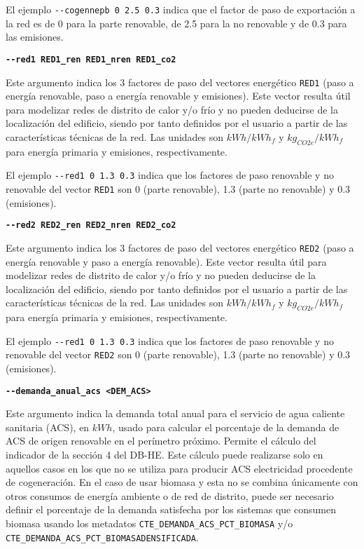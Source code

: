 \documentclass[10pt,notitlepage,oneside,a4paper]{article}
\begin{document}
El ejemplo \texttt{-{}-cogennepb 0 2.5 0.3} indica que el factor de paso de exportación a la red es de 0 para la parte renovable, de 2.5 para la no renovable y de 0.3 para las emisiones.

\textbf{\texttt{-{}-red1 RED1\_ren RED1\_nren RED1\_co2}}

Este argumento indica los 3 factores de paso del vectores energético \texttt{RED1} (paso a energía renovable, paso a energía renovable y emisiones). Este vector resulta útil para modelizar redes de distrito de calor y/o frío y no pueden deducirse de la localización del edificio, siendo por tanto definidos por el usuario a partir de las características técnicas de la red. Las unidades son $kWh/kWh_f$ y $kg_{CO2e}/kWh_f$ para energía primaria y emisiones, respectivamente.

El ejemplo \texttt{-{}-red1 0 1.3 0.3} indica que los factores de paso renovable y no renovable del vector \texttt{RED1} son 0 (parte renovable), 1.3 (parte no renovable) y 0.3 (emisiones).

\textbf{\texttt{-{}-red2 RED2\_ren RED2\_nren RED2\_co2}}

Este argumento indica los 3 factores de paso del vectores energético \texttt{RED2} (paso a energía renovable y paso a energía renovable). Este vector resulta útil para modelizar redes de distrito de calor y/o frío y no pueden deducirse de la localización del edificio, siendo por tanto definidos por el usuario a partir de las características técnicas de la red. Las unidades son $kWh/kWh_f$ y $kg_{CO2e}/kWh_f$ para energía primaria y emisiones, respectivamente.

El ejemplo \texttt{-{}-red1 0 1.3 0.3} indica que los factores de paso renovable y no renovable del vector \texttt{RED2} son 0 (parte renovable), 1.3 (parte no renovable) y 0.3 (emisiones).

\textbf{\texttt{-{}-demanda\_anual\_acs <DEM\_ACS>}}

Este argumento indica la demanda total anual para el servicio de agua caliente sanitaria (ACS), en  $kWh$, usado para calcular el porcentaje de la demanda de ACS de origen renovable en el perímetro próximo. Permite el cálculo del indicador de la sección 4 del DB-HE. Este cálculo puede realizarse solo en aquellos casos en los que no se utiliza para producir ACS electricidad procedente de cogeneración. En el caso de usar biomasa y esta no se combina únicamente con otros consumos de energía ambiente o de red de distrito, puede ser necesario definir el porcentaje de la demanda satisfecha por los sistemas que consumen biomasa usando los metadatos \texttt{CTE\_DEMANDA\_ACS\_PCT\_BIOMASA} y/o \texttt{CTE\_DEMANDA\_ACS\_PCT\_BIOMASADENSIFICADA}.
\end{document}
